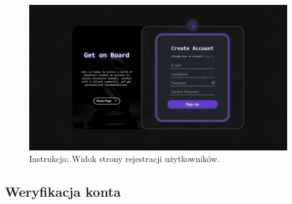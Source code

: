 \documentclass[twoside]{projektInzynierskiMS1}
\begin{document}
\vspace{0.5cm}
\begin{figure}[h!]
    \centering
    \includegraphics[width=1\textwidth]{images/ins_reg.png}
    \caption{Instrukcja: Widok strony rejestracji użytkowników.}
\end{figure}
\vspace{0.5cm}

\newpage

\subsection{Weryfikacja konta}
\end{document}
